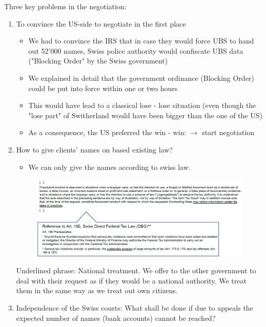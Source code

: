 Three key problems in the negotiation:
\begin{enumerate}[1)]
    \item To convince the US-side to negotiate in the first place
        \begin{itemize}
            \item We had to convince the IRS that in case they would force UBS
                to hand out 52'000 names, Swiss police authority would confiscate
                UBS data ("Blocking Order" by the Swiss government)
            \item We explained in detail that the government ordinance (Blocking Order)
                could be put into force within one or two hours
            \item This would have lead to a classical lose - lose situation (even though
                the "lose part" of Switherland would have been bigger than the one of
                the US)
            \item As a consequence, the US preferred the win - win: $\rightarrow$ start negotiation
        \end{itemize}
    \item How to give clients' names on based existing law?
        \begin{itemize}
            \item We can only give the names according to swiss law.
        \end{itemize}
        \begin{figure}[H]
            \centering
            \includegraphics[width=\textwidth]{Pictures/UBS_USA_problem_2.png}
        \end{figure}
        Underlined phrase: National treatment. We offer to the other government
        to deal with their request as if they would be a national authority.
        We treat them in the same way as we treat out own citizens.
    \item Independence of the Swiss courts: What shall be done if due to
        appeals the expected number of names (bank accounts) cannot be reached?

\end{enumerate}
